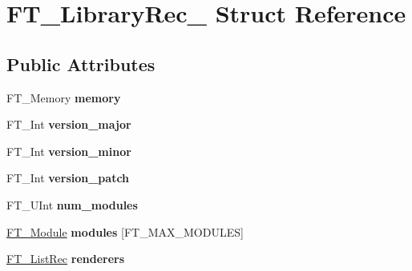 \hypertarget{struct_f_t___library_rec__}{}\section{F\+T\+\_\+\+Library\+Rec\+\_\+ Struct Reference}
\label{struct_f_t___library_rec__}
\subsection*{Public Attributes}
\begin{DoxyCompactItemize}
\item 
\mbox{\label{struct_f_t___library_rec___afe392b83bc018b1b1fb25459f68a5861}} 
F\+T\+\_\+\+Memory {\bfseries memory}
\item 
\mbox{\label{struct_f_t___library_rec___a218c30755bac8b58592d70148c938e38}} 
F\+T\+\_\+\+Int {\bfseries version\+\_\+major}
\item 
\mbox{\label{struct_f_t___library_rec___a211d591fbc89d9471715638809865290}} 
F\+T\+\_\+\+Int {\bfseries version\+\_\+minor}
\item 
\mbox{\label{struct_f_t___library_rec___a51ab560542e78c5e65e248b5a94f66a1}} 
F\+T\+\_\+\+Int {\bfseries version\+\_\+patch}
\item 
\mbox{\label{struct_f_t___library_rec___af75d01983c4d91bb3373583424750afa}} 
F\+T\+\_\+\+U\+Int {\bfseries num\+\_\+modules}
\item 
\mbox{\label{struct_f_t___library_rec___af66a4d9e9fbcaa2ff0e18a9cc8d3d89d}} 
\hyperlink{struct_f_t___module_rec__}{F\+T\+\_\+\+Module} {\bfseries modules} \mbox{[}F\+T\+\_\+\+M\+A\+X\+\_\+\+M\+O\+D\+U\+L\+ES\mbox{]}
\item 
\mbox{\label{struct_f_t___library_rec___ad9503f71cf4e4d88edfbdda59eb5e43d}} 
\hyperlink{struct_f_t___list_rec__}{F\+T\+\_\+\+List\+Rec} {\bfseries renderers}
\item 
\mbox{\label{struct_f_t___library_rec___a528dd3298756070ecad7d0f82f009294}} 

\end{DoxyCompactItemize}
